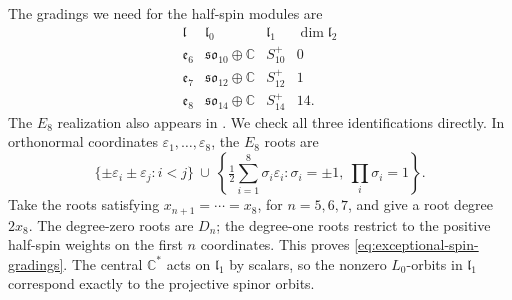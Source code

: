 \documentclass{article}
\theoremstyle{definition}
\theoremstyle{remark}
\newcommand{\C}{\mathbb C}
\begin{document}
The gradings we need for the half-spin modules are
\begin{equation}
\begin{array}{c|ccc}
\mathfrak l&\mathfrak l_0&\mathfrak l_1&\dim\mathfrak l_2\\\hline
\mathfrak e_6&\mathfrak{so}_{10}\oplus\C&S_{10}^+&0\\
\mathfrak e_7&\mathfrak{so}_{12}\oplus\C&S_{12}^+&1\\
\mathfrak e_8&\mathfrak{so}_{14}\oplus\C&S_{14}^+&14.
\end{array}
\label{eq:exceptional-spin-gradings}
\end{equation}
The $E_8$ realization also appears in \cite{AbuafManivel2021}.
We check all three identifications directly. In orthonormal coordinates
$\varepsilon_1,\ldots,\varepsilon_8$, the $E_8$ roots are
\begin{equation}
 \{\pm\varepsilon_i\pm\varepsilon_j:i<j\}
 \ \cup\
 \left\{\tfrac12\sum_{i=1}^8\sigma_i\varepsilon_i:
 \sigma_i=\pm1,\ \prod_i\sigma_i=1\right\}.
 \label{eq:ambient-E8-roots}
\end{equation}
Take the roots satisfying $x_{n+1}=\cdots=x_8$, for $n=5,6,7$,
and give a root degree $2x_8$. The degree-zero roots are $D_n$;
the degree-one roots restrict to the positive half-spin weights on the
first $n$ coordinates. This proves \eqref{eq:exceptional-spin-gradings}.
The central $\C^*$ acts on $\mathfrak l_1$ by scalars, so the nonzero
$L_0$-orbits in $\mathfrak l_1$ correspond exactly to the projective spinor
orbits.
\end{document}
